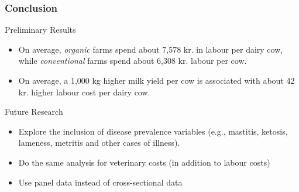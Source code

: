 \documentclass[t,24pt,aspectratio=169]{beamer}
\begin{document}
\begin{frame}[hvid]
\frametitle{\vspace{-3ex}Conclusion}
Preliminary Results
\begin{itemize}
     \item On average, \textit{organic} farms spend about 7,578 kr. in labour per dairy cow, while \textit{conventional} farms spend about 6,308 kr. labour per cow.
     \item On average, a 1,000 kg higher milk yield per cow is associated with about 42 kr. higher labour cost per dairy cow.
\end{itemize}
\vspace{2ex}
Future Research
\begin{itemize}
    \item Explore the inclusion of disease prevalence variables (e.g., mastitis, ketosis, lameness, metritis and other cases of illness).
    \item Do the same analysis for veterinary costs (in addition to labour costs)
    \item Use panel data instead of cross-sectional data
\end{itemize}
\end{frame}
\end{document}
